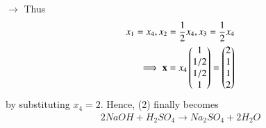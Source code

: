 \documentclass[journal]{IEEEtran}
\begin{document}
$\rightarrow$ Thus
\begin{align}
    x_1 = x_4, x_2 = \frac{1}{2}x_4, x_3 = \frac{1}{2}x_4 \\
    \implies \mathbf{x} = x_4\begin{pmatrix}1\\1/2\\1/2\\1\end{pmatrix} = \begin{pmatrix}2\\1\\1\\2\end{pmatrix}
\end{align}
\hspace{0.3cm} by substituting $x_4 = 2$. Hence, (2) finally becomes
\begin{align}
    2NaOH + H_2SO_4 \rightarrow Na_2SO_4 + 2H_2O
\end{align}
\end{document}
